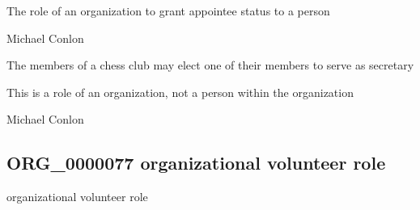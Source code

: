 \documentclass[letterpaper,10pt,english]{sphinxmanual}
\begin{document}
\begin{sphinxShadowBox}

\sphinxAtStartPar
{\hyperref[\detokenize{doc-BFO_0000023::doc}]{}}
\end{sphinxShadowBox}

\begin{sphinxShadowBox}

\sphinxAtStartPar
The role of an organization to grant appointee status to a person
\end{sphinxShadowBox}

\begin{sphinxShadowBox}

\sphinxAtStartPar
Michael Conlon 
\end{sphinxShadowBox}

\begin{sphinxShadowBox}

\sphinxAtStartPar
The members of a chess club may elect one of their members to serve as secretary
\end{sphinxShadowBox}

\begin{sphinxShadowBox}

\sphinxAtStartPar
This is a role of an organization, not a person within the organization
\end{sphinxShadowBox}

\begin{sphinxShadowBox}

\sphinxAtStartPar
Michael Conlon 
\end{sphinxShadowBox}
\begin{quote}

\ignorespaces \end{quote}


\subsection{ORG\_0000077 \sphinxhyphen{} organizational volunteer role}
\label{\detokenize{doc-ORG_0000077:org-0000077-organizational-volunteer-role}}\label{\detokenize{doc-ORG_0000077:index-0}}\label{\detokenize{doc-ORG_0000077::doc}}
\begin{sphinxShadowBox}

\sphinxAtStartPar
organizational volunteer role
\end{sphinxShadowBox}
\end{document}
